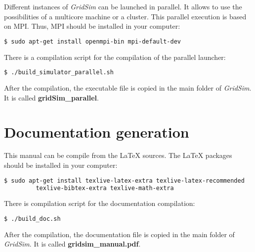 Different instances of {\it GridSim} can be launched in parallel.
It allows to use the possibilities of a multicore machine or a cluster.
This parallel execution is based on MPI.
Thus, MPI should be installed in your computer:
\begin{lstlisting}[language=bash]
  $ sudo apt-get install openmpi-bin mpi-default-dev
\end{lstlisting}

There is a compilation script for the compilation of the parallel launcher:
\begin{lstlisting}[language=bash]
  $ ./build_simulator_parallel.sh
\end{lstlisting}
\noindent
After the compilation, the executable file is copied in the main folder of {\it GridSim}.
It is called {\bf gridSim\_parallel}.

%
\section{Documentation generation}

This manual can be compile from the {\LaTeX} sources.
The {\LaTeX} packages should be installed in your computer:
\begin{lstlisting}[language=bash]
  $ sudo apt-get install texlive-latex-extra texlive-latex-recommended
		 texlive-bibtex-extra texlive-math-extra 
\end{lstlisting}

There is compilation script for the documentation compilation:
\begin{lstlisting}[language=bash]
  $ ./build_doc.sh
\end{lstlisting}
\noindent
After the compilation, the documentation file is copied in the main folder of {\it GridSim}.
It is called {\bf gridsim\_manual.pdf}.


